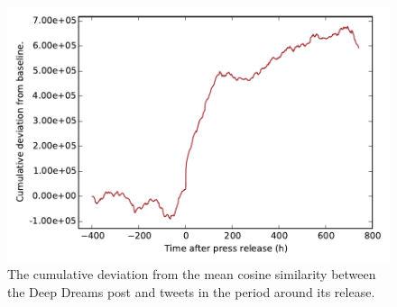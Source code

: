 \begin{figure} %
	\centering
	\includegraphics[width=\figwidth]{pics/esa/deep_dreams_tweet_by_tweet.pdf}
	\caption{The cumulative deviation from the mean cosine similarity between the Deep Dreams post and tweets in the period around its release.}
	\label{fig:deep_dreams_cumulative_blabla}
\end{figure}